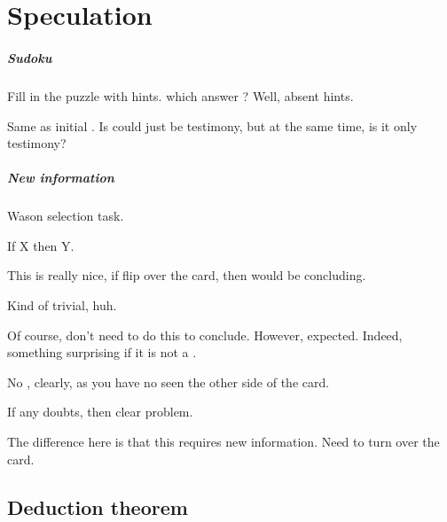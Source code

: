 \chapter{Speculation}
\label{cha:speculation}

\paragraph{Sudoku}

\begin{note}
  Fill in the puzzle with hints.
   which answer \qWhyV{}?
  Well, absent hints.

  Same as initial .
  Is could just be testimony, but at the same time, is it only testimony?
\end{note}

\paragraph{New information}

\begin{note}
  \begin{scenario}
    Wason selection task.

    If X then Y.
  \end{scenario}

  This is really nice, if flip over the card, then would be concluding.

  Kind of trivial, huh.

  Of course, don't need to do this to conclude.
  However, expected.
  Indeed, something surprising if it is not a \fc{}.

  No \wit{}, clearly, as you have no seen the other side of the card.

  If any doubts, then clear problem.

  The difference here is that this requires new information.
  Need to turn over the card.
\end{note}


\section{Deduction theorem}

